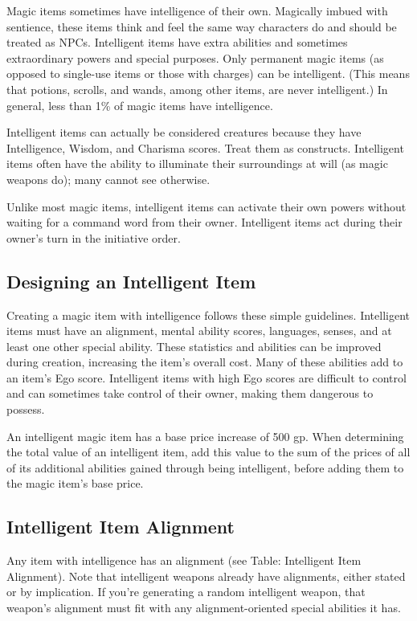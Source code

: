 				
Magic items sometimes have intelligence of their own. Magically imbued with sentience, these items think and feel the same way characters do and should be treated as NPCs. Intelligent items have extra abilities and sometimes extraordinary powers and special purposes. Only permanent magic items (as opposed to single-use items or those with charges) can be intelligent. (This means that potions, scrolls, and wands, among other items, are never intelligent.) In general, less than 1\% of magic items have intelligence.
				
Intelligent items can actually be considered creatures because they have Intelligence, Wisdom, and Charisma scores. Treat them as constructs. Intelligent items often have the ability to illuminate their surroundings at will (as magic weapons do); many cannot see otherwise.
				
Unlike most magic items, intelligent items can activate their own powers without waiting for a command word from their owner. Intelligent items act during their owner's turn in the initiative order.
				
\subsection{Designing an Intelligent Item}

				
Creating a magic item with intelligence follows these simple guidelines. Intelligent items must have an alignment, mental ability scores, languages, senses, and at least one other special ability. These statistics and abilities can be improved during creation, increasing the item's overall cost. Many of these abilities add to an item's Ego score. Intelligent items with high Ego scores are difficult to control and can sometimes take control of their owner, making them dangerous to possess.
				
An intelligent magic item has a base price increase of 500 gp. When determining the total value of an intelligent item, add this value to the sum of the prices of all of its additional abilities gained through being intelligent, before adding them to the magic item's base price.
				
\subsection{Intelligent Item Alignment}

				
Any item with intelligence has an alignment (see Table: Intelligent Item Alignment). Note that intelligent weapons already have alignments, either stated or by implication. If you're generating a random intelligent weapon, that weapon's alignment must fit with any alignment-oriented special abilities it has.
				

